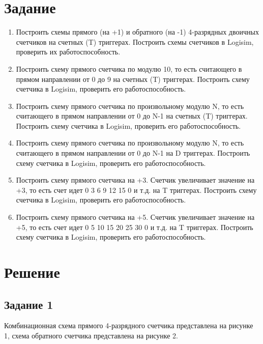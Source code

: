 \documentclass[a4paper,14pt]{extarticle}
\begin{document}
	\section*{Задание}
	\begin{enumerate}
		\item Построить схемы прямого (на +1) и обратного (на -1) 4-разрядных двоичных счетчиков на счетных (T) триггерах. Построить схемы счетчиков в Logisim, проверить их работоспособность.
		
		\item Построить схему прямого счетчика по модулю 10, то есть считающего в прямом направлении от 0 до 9 на счетных (T) триггерах. Построить схему счетчика в Logisim, проверить его работоспособность.
		
		\item Построить схему прямого счетчика по произвольному модулю N, то есть считающего в прямом направлении от 0 до N-1 на счетных (T) триггерах. Построить схему счетчика в Logisim, проверить его работоспособность.
		
		\item Построить схему прямого счетчика по произвольному модулю N, то есть считающего в прямом направлении от 0 до N-1 на D триггерах. Построить схему счетчика в Logisim, проверить его работоспособность.
		
		\item Построить схему прямого счетчика на +3. Счетчик увеличивает значение на +3, то есть счет идет 0 3 6 9 12 15 0 и т.д. на T триггерах. Построить схему счетчика в Logisim, проверить его работоспособность.
		
		\item Построить схему прямого счетчика на +5. Счетчик увеличивает значение на +5, то есть счет идет 0 5 10 15 20 25 30 0 и т.д. на T триггерах. Построить схему счетчика в Logisim, проверить его работоспособность.
		
	\end{enumerate}
	
	\newpage
	\section*{Решение}
	\subsection*{Задание 1}
	Комбинационная схема прямого 4-разрядного счетчика представлена на рисунке 1, схема обратного счетчика представлена на рисунке 2.
	
\end{document}

